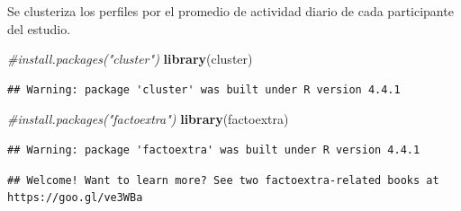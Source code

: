 \documentclass[
]{article}
\newenvironment{Shaded}{\begin{snugshade}}{\end{snugshade}}
\newcommand{\AttributeTok}[1]{\textcolor[rgb]{0.13,0.29,0.53}{#1}}
\newcommand{\CommentTok}[1]{\textcolor[rgb]{0.56,0.35,0.01}{\textit{#1}}}
\newcommand{\DecValTok}[1]{\textcolor[rgb]{0.00,0.00,0.81}{#1}}
\newcommand{\FunctionTok}[1]{\textcolor[rgb]{0.13,0.29,0.53}{\textbf{#1}}}
\newcommand{\NormalTok}[1]{#1}
\newcommand{\OtherTok}[1]{\textcolor[rgb]{0.56,0.35,0.01}{#1}}
\newcommand{\SpecialCharTok}[1]{\textcolor[rgb]{0.81,0.36,0.00}{\textbf{#1}}}
\begin{document}
Se clusteriza los perfiles por el promedio de actividad diario de cada
participante del estudio.

\begin{Shaded}
\begin{Highlighting}[]
\CommentTok{\#install.packages("cluster")}
\FunctionTok{library}\NormalTok{(cluster)}
\end{Highlighting}
\end{Shaded}

\begin{verbatim}
## Warning: package 'cluster' was built under R version 4.4.1
\end{verbatim}

\begin{Shaded}
\begin{Highlighting}[]
\CommentTok{\#install.packages("factoextra")}
\FunctionTok{library}\NormalTok{(factoextra)}
\end{Highlighting}
\end{Shaded}

\begin{verbatim}
## Warning: package 'factoextra' was built under R version 4.4.1
\end{verbatim}

\begin{verbatim}
## Welcome! Want to learn more? See two factoextra-related books at https://goo.gl/ve3WBa
\end{verbatim}

\begin{Shaded}
\end{Shaded}
\end{document}
